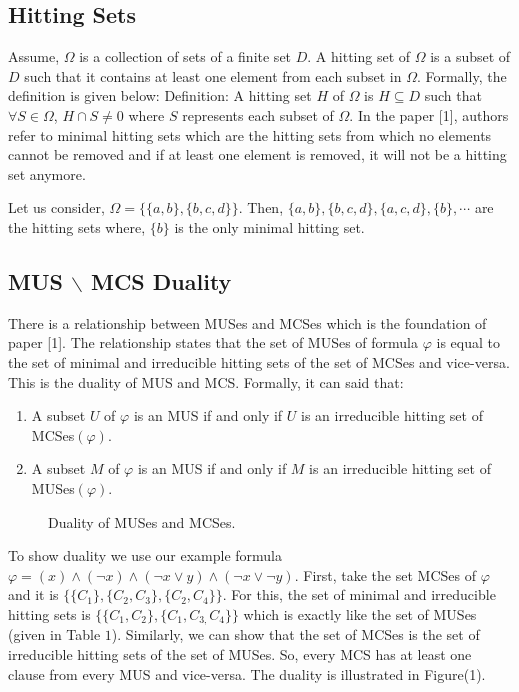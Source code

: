 \subsection{Hitting Sets}
Assume, $\Omega$ is a collection of sets of a finite set $D$. A hitting set of $\Omega$ is a subset of $D$ such that it contains at least one element from each subset in $\Omega$. Formally, the definition is given below:\newline
Definition: A hitting set $H$ of $\Omega$ is $H\subseteq D$ such that $\forall S\in \Omega$, $H\cap S\neq 0$ where $S$ represents each subset of $\Omega$.\newline
In the paper [1], authors refer to minimal hitting sets which are the hitting sets from which no elements cannot be removed and if at least one element is removed, it will not be a hitting set anymore.\newline
\begin{example}
Let us consider, $\Omega=\{\{a, b\}, \{b, c, d\}\}$. Then, $\{a,b\}, \{b,c,d\}, \{a,c,d\}, \{b\},\cdots$ are the hitting sets where, $\{b\}$ is the only minimal hitting set.	
\end{example}
\subsection{MUS $\backslash$ MCS Duality}
There is a relationship between MUSes and MCSes which is the foundation of paper [1]. The relationship states that the set of MUSes of formula $\varphi$ is equal to the set of minimal and irreducible hitting sets of the set of MCSes and vice-versa. This is the duality of MUS and MCS. Formally, it can said that:
\begin{enumerate}
	\item A subset $U$ of $\varphi$ is an MUS if and only if $U$ is an irreducible hitting set of MCSes$(\varphi)$.
	\item A subset $M$ of $\varphi$ is an MUS if and only if $M$ is an irreducible hitting set of MUSes$(\varphi)$.
\end{enumerate}
\begin{figure}[htb] %
	\begin{center}
		
	\end{center}
	\caption{Duality of MUSes and MCSes.}
	\label{fig:graph}
\end{figure}
To show duality we use our example formula $\varphi=(x)\wedge(\neg x)\wedge(\neg x\vee y)\wedge(\neg x \vee \neg y)$. First, take the set MCSes of $\varphi$ and it is $\{\{C_{1}\}, \{C_{2}, C_{3}\}, \{C_{2}, C_{4}\}\}$. For this, the set of minimal and irreducible hitting sets is $\{\{C_{1}, C_{2}\}, \{C_{1}, C_{3,} C_{4}\}\}$ which is exactly like the set of MUSes (given in Table $1$). Similarly, we can show that the set of MCSes is the set of irreducible hitting sets of the set of MUSes. So, every MCS has at least one clause from every MUS and vice-versa. The duality is illustrated in Figure(1).
